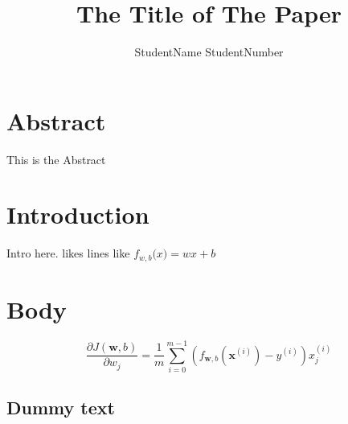 \documentclass{article}
\author{StudentName StudentNumber}
\title{The Title of The Paper}
\begin{document}
	\maketitle

	\section{Abstract}
	This is the Abstract

	\section{Introduction}
	Intro here. \parencite{santos_artificial_2023} likes lines like  $f_{w,b}\big(x\big) = wx+b$

	\section{Body}

	\begin{equation}
		\frac{\partial J(\mathbf{w},b)}{\partial w_j}  = \frac{1}{m} \sum\limits_{i = 0}^{m-1} (f_{\mathbf{w},b}(\mathbf{x}^{(i)}) - y^{(i)})x_{j}^{(i)}
	\end{equation}

	\subsection{Dummy text}
	\blindtext[8]

	\printbibliography
\end{document}
